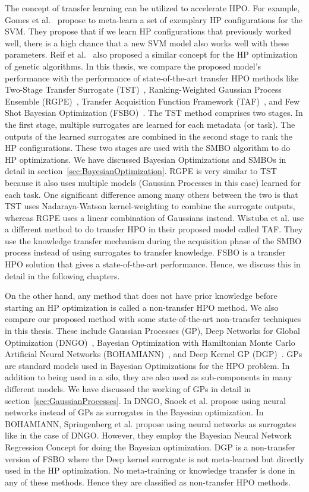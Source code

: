 \documentclass[12pt, twoside, ngerman]{report}
\begin{document}
The concept of transfer learning can be utilized to accelerate HPO.
For example,  Gomes et al.~\cite{svmhpmetalearnt} propose to meta-learn a set of exemplary HP configurations for the SVM.
They propose that if we learn HP configurations that previously worked well, there is a high chance that a new SVM model also works well with these parameters.
Reif et al.~\cite{metalearningwarmstartpaper} also proposed a similar concept for the HP optimization of genetic algorithms.
In this thesis, we compare the proposed model's performance with the performance of state-of-the-art transfer HPO methods like Two-Stage Transfer Surrogate (TST)~\cite{tstpaper}, Ranking-Weighted Gaussian Process Ensemble (RGPE)~\cite{Feurer2018ScalableMF}, Transfer Acquisition Function Framework (TAF)~\cite{Wistuba2017ScalableGP}, and Few Shot Bayesian Optimization (FSBO)~\cite{fsbopaper}.
The TST method comprises two stages. In the first stage, multiple surrogates are learned for each metadata (or task). The outputs of the learned surrogates are combined in the second stage to rank the HP configurations. These two stages are used with the SMBO algorithm to do HP optimizations. We have discussed Bayesian Optimizations and SMBOs in detail in section~\ref{sec:BayesianOptimization}.
RGPE is very similar to TST because it also uses multiple models (Gaussian Processes in this case) learned for each task. One significant difference among many others between the two is that TST uses Nadaraya-Watson kernel-weighting to combine the surrogate outputs, whereas RGPE uses a linear combination of Gaussians instead. Wistuba et al. use a different method to do transfer HPO in their proposed model called TAF. They use the knowledge transfer mechanism during the acquisition phase of the SMBO process instead of using surrogates to transfer knowledge.
FSBO is a transfer HPO solution that gives a state-of-the-art performance.  Hence, we discuss this in detail in the following chapters.

On the other hand, any method that does not have prior knowledge before starting an HP optimization is called a non-transfer HPO method.
We also compare our proposed method with some state-of-the-art non-transfer techniques in this thesis. These include Gaussian Processes (GP), Deep Networks for Global Optimization (DNGO)~\cite{dngopaper}, Bayesian Optimization with Hamiltonian Monte Carlo Artificial Neural Networks (BOHAMIANN)~\cite{bohamiannpaper}, and Deep Kernel GP (DGP)~\cite{fsbopaper}. GPs are standard models used in Bayesian Optimizations for the HPO problem. In addition to being used in a silo, they are also used as sub-components in many different models. We have discussed the working of GPs in detail in section~\ref{sec:GaussianProcesses}. In DNGO, Snoek et al. propose using neural networks instead of GPs as surrogates in the Bayesian optimization. In BOHAMIANN, Springenberg et al. propose using neural networks as surrogates like in the case of DNGO. However, they employ the Bayesian Neural Network Regression Concept for doing the Bayesian optimization.
DGP is a non-transfer version of FSBO where the Deep kernel surrogate is not meta-learned but directly used in the HP optimization.
No meta-training or knowledge transfer is done in any of these methods. Hence they are classified as non-transfer HPO methods.
\end{document}

